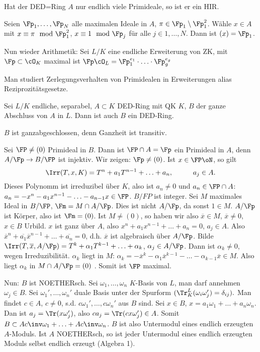 \begin{Fakt}
 Hat der DED=Ring $A$ nur endlich viele Primideale, so ist er ein HIR.
\end{Fakt}

\begin{Beweis}
 Seien $\Fp_1,\ldots,\Fp_N$ alle maximalen Ideale in $A$, $\pi\in\Fp_1\setminus\Fp_1^2$. Wähle $x\in A$ mit $x\equiv \pi\mod{\Fp_1^2}$, $x\equiv 1\mod{\Fp_j}$
 für alle $j\in 1,\ldots, N$.
 Dann ist $(x)=\Fp_1$.
 \end{Beweis}
 
 Nun wieder Arithmetik: Sei $L/K$ eine endliche Erweiterung von ZK, mit $\Fp\subset\cO_K$ maximal ist $\Fp\cO_L=\Fp_1^{e_1}\cdot\ldots\cdot\Fp_g^{e_g}$

Man studiert Zerlegungsverhalten von Primidealen in Erweiterungen alias Reziprozitätsgesetze.

\begin{Fakt}
 Sei $L/K$ endliche, separabel, $A\subset K$ DED-Ring mit QK $K$, $B$ der ganze Abschluss von $A$ in $L$. Dann ist auch $B$ ein DED-Ring.
\end{Fakt}

\begin{Beweis}
 $B$ ist ganzabgeschlossen, denn Ganzheit ist transitiv. 
 
 Sei $\FP\neq (0)$ Primideal in $B$. Dann ist $\FP\cap A = \Fp$ ein Primideal in $A$, denn $A/\Fp \rightarrow B/\FP$ ist injektiv.
 Wir zeigen: $\Fp\neq (0)$. Ist $x\in\FP\oN$, so gilt 
 \[ \Irr(T,x,K)=T^n+a_1T^{n-1}+\ldots+a_n, \hspace{1cm} a_j\in A.\]
 Dieses Polynomm ist irreduzibel über $K$, also ist $a_n\neq 0$ und $a_n\in\FP\cap A$: $a_n=-x^n-a_1x^{n-1}-\ldots-a_{n-1}x\in\FP$. $B/FP$ ist integer. Sei $M$ maximales Ideal in $B/\FP$, $\Fm=M\cap A/\Fp$. Dies ist nicht $A/\Fp$, da sonst $1\in M$. $A/\Fp$ ist Körper, also ist $\Fm=(0)$. Ist $M\neq(0)$, so haben wir also $\overline x\in M$, $\overline{x}\neq 0$, $x\in B$ Urbild. $x$ ist ganz über $A$, also
 $x^n+a_1x^{n-1}+\ldots+a_n=0$, $a_j\in A$. Also $\overline{x}^n+\overline{a_1}\overline{x}^{n-1}+\ldots+\overline{a_n}=0$, d.h. $\overline{x}$ ist algebraisch über $A/\Fp$. Bilde $\Irr(T,\overline{x},A/\Fp)=
 T^k+\alpha_1 T^{k-1}+\ldots + \alpha_k$, $\alpha_j\in A/\Fp$. Dann ist $\alpha_k\neq 0$, wegen Irreduzibilität. $\alpha_k$ liegt in $M$: $\alpha_k=-\overline{x}^k-\alpha_1\overline{x}^{k-1}-\ldots -\alpha_{k-1}\overline{x}\in M$. Also liegt $\alpha_k$ in $M\cap A/\Fp=(0)$ \lightning. Somit ist $\FP$ maximal.
 
 Nun: $B$ ist NOETHERsch. Sei $\omega_1,\ldots,\omega_n$ $K$-Basis von $L$, man darf annehmen $\omega_j\in B$. Sei $\omega_1',\ldots,\omega_n'$ duale Basis unter der Spurform $(\Tr_K^L(\omega_i\omega_j')=\delta_{ij}).$
 Man findet $c\in A$, $c\neq 0$, s.d. $c\omega_1',\ldots, c\omega_n'$ aus $B$ sind. Sei $x\in B$, $x=a_1\omega_1+\ldots +a_n\omega_n$. Dan ist $a_j=\Tr(x\omega_j')$, also $ca_j=\Tr(cx\omega_j')\in A$. Somit $B\subset Ac\inv\omega_1+\ldots + Ac\inv\omega_n$. $B$ ist also Untermodul eines endlich erzeugten $A$-Moduls. Ist $A$ NOETHERsch, so ist jeder Untermodul eines endlich erzeugten Moduls selbst endlich erzeugt (Algebra 1).
\end{Beweis}


